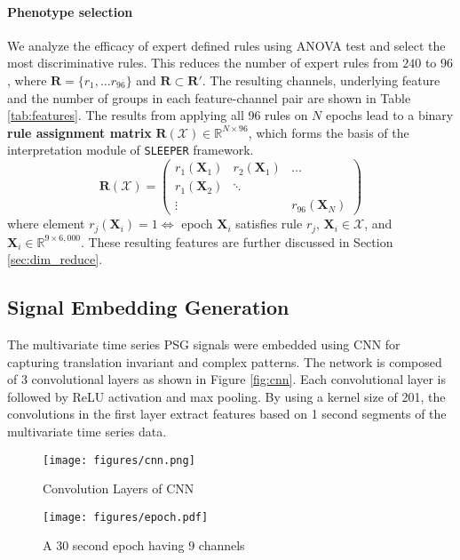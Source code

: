 \documentclass[pmlr]{jmlr}
\newcommand{\mname}
{\texttt{SLEEPER}\xspace}
\begin{document}
\paragraph{Phenotype selection} We analyze the efficacy of expert defined rules using ANOVA test and select the most discriminative rules.  This reduces the number of expert rules from $240$ to $96$, where $\bm{R}=\{r_1 , \dots r_{96}\}$ and $\bm{R} \subset \bm{R}'$. The resulting channels, underlying feature and the number of groups in each feature-channel pair are shown in Table \ref{tab:features}.  The results from applying all 96 rules on $N$ epochs lead to a binary {\bf rule assignment matrix} $\bm{R}(\mathcal{X})\in \mathbb{R}^{N\times 96}$, which  forms the basis of the interpretation module of \mname framework. 
\begin{equation}\label{eq:rules}
    \bm{R}(\mathcal{X}) = \begin{pmatrix}
                r_1(\bm{X}_1)    & r_2(\bm{X}_1)  & \dots     \\
                r_1(\bm{X}_2)    & \ddots    &           \\
                \vdots      &           &r_{96}(\bm{X}_N)  
            \end{pmatrix}
\end{equation}
where element $r_j(\bm{X}_i) = 1 \Leftrightarrow$ epoch $\bm{X}_i$ satisfies rule $r_j$, $\bm{X}_i\in \mathcal{X}  $, and $\bm{X}_i \in \mathbb{R}^{9\times6,000}$. These resulting features are further discussed in Section \ref{sec:dim_reduce}.

\subsection{Signal Embedding Generation}
The multivariate time series PSG signals were embedded using CNN for capturing translation invariant and complex patterns. The network is composed of 3 convolutional layers as shown in Figure \ref{fig:cnn}. Each convolutional layer is followed by ReLU activation and max pooling. By using a kernel size of 201, the convolutions in the first layer extract features based on 1 second segments of the multivariate time series data.

\begin{figure*}
\begin{minipage}[c]{0.49\textwidth}
\centering
    \texttt{[image: figures/cnn.png]}
    \caption{Convolution Layers of CNN }
    \label{fig:cnn}
\end{minipage}
\begin{minipage}[c]{0.49\textwidth}
    \centering
    \texttt{[image: figures/epoch.pdf]}
    \caption{A 30 second epoch having 9 channels}
    \label{fig:epoch}
\end{minipage}
\end{figure*}
\end{document}
